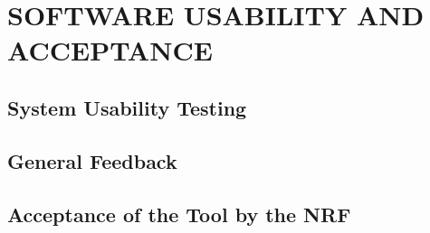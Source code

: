\section{SOFTWARE USABILITY AND ACCEPTANCE}\label{sec:software-usability-and-acceptance}
\subsection{System Usability Testing}\label{subsec:system-usability-testing}
\subsection{General Feedback}\label{subsec:general-feedback}
\subsection{Acceptance of the Tool by the NRF}\label{subsec:acceptance-of-the-tool-by-the-nrf}
